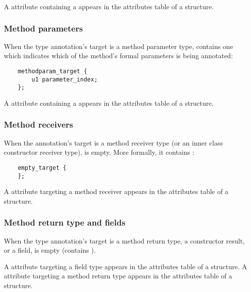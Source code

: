 \documentclass[10pt]{article}
\begin{document}
A \RuntimeInOrVisibleTypeAnnotations attribute containing a
 appears in the attributes table of a
 structure.

\subsubsection{Method parameters\label{class-file:ext:ri:parameters}}

When the type annotation's target is a method parameter type,
 contains one  which
indicates which of the method's formal parameters is being annotated:

\begin{Verbatim}
    methodparam_target {
        u1 parameter_index;
    };
\end{Verbatim}

A \RuntimeInOrVisibleTypeAnnotations attribute containing a
 appears in the attributes table of a
 structure.

\subsubsection{Method receivers\label{class-file:ext:ri:receiver}}

When the annotation's target is a method receiver type (or an inner class
constructor receiver type),  is empty.  More formally, it
contains :

\begin{Verbatim}
    empty_target {
    };
\end{Verbatim}


A \RuntimeInOrVisibleTypeAnnotations attribute targeting
a method receiver appears in the attributes table of a
 structure.


\subsubsection{Method return type and fields\label{class-file:ext:ri:return}}

When the type annotation's target is a method return type, a constructor
result, or a field,  is empty (contains ).

A \RuntimeInOrVisibleTypeAnnotations attribute targeting a field
type appears in the attributes table of a  structure.
A \RuntimeInOrVisibleTypeAnnotations attribute targeting a method return
type appears in the attributes table of a  structure.
\end{document}

